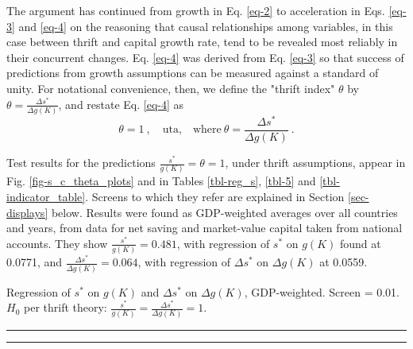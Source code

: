 \documentclass[a4paper,fleqn]{latex_styles/cas-sc}
\begin{document}
The argument has continued from growth in Eq. \eqref{eq-2} to acceleration in Eqs. \eqref{eq-3} and \eqref{eq-4} on the reasoning that causal relationships among variables, in this case between thrift and capital growth rate, tend to be revealed most reliably in their concurrent changes. Eq. \eqref{eq-4} was derived from Eq. \eqref{eq-3} so that success of predictions from growth assumptions can be measured against a standard of unity. For notational convenience, then, we define the "thrift index" \(\theta\) by \(\theta = \frac{\Delta s^*}{\Delta g(K)}\), and restate Eq. \eqref{eq-4} as
%
\begin{equation}
\theta = 1\ , \quad \text{uta,}\quad \text{where} \ \theta = \frac{\Delta s^*}{\Delta g(K)}\ . \label{eq-5}
\end{equation}
%

Test results for the predictions \(\frac{s^*}{g(K)} = \theta = 1\), under thrift assumptions, appear in Fig. \ref{fig-s_c_theta_plots} and in Tables \ref{tbl-reg_s}, \ref{tbl-5} and \ref{tbl-indicator_table}. Screens to which they refer are explained in Section \ref{sec-displays} below. Results were found as GDP-weighted averages over all countries and years, from data for net saving and market-value capital taken from national accounts. They show \(\frac{s^*}{g(K)} = 0.481\), with regression of \(s^*\) on \(g(K)\) found at 0.0771, and \(\frac{\Delta s^*}{\Delta g(K)} = 0.064\), with regression of \(\Delta s^*\) on \(\Delta g(K)\) at 0.0559.
%
\begin{table}[pos=h]
    \caption{Regression of \(s^*\) on \(g(K)\) and \(\Delta s^*\) on \(\Delta g(K)\), GDP-weighted. Screen = 0.01. \(H_0\) per thrift theory: \(\frac{s^*}{g(K)} = \frac{\Delta s^*}{\Delta g(K)} = 1\).\label{tbl-reg_s}}
    \hrule
    \centering
\begin{minipage}{0.45\textwidth}

\end{minipage}
\hfill
    \begin{minipage}{0.45\textwidth}

\end{minipage}
\hrule
\end{table}
%
%
\end{document}
